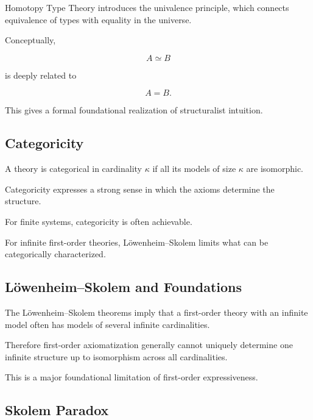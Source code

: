 Homotopy Type Theory introduces the univalence principle, which connects
equivalence of types with equality in the universe.

Conceptually,

\[
\boxed{
A\simeq B
}
\]

is deeply related to

\[
\boxed{
A=B.
}
\]

This gives a formal foundational realization of structuralist intuition.

\subsection{Categoricity}
\label{subsec:categoricity-foundations}

A theory is categorical in cardinality \(\kappa\) if all its models of size
\(\kappa\) are isomorphic.

Categoricity expresses a strong sense in which the axioms determine the
structure.

For finite systems, categoricity is often achievable.

For infinite first-order theories, Löwenheim--Skolem limits what can be
categorically characterized.

\subsection{Löwenheim--Skolem and Foundations}
\label{subsec:lowenheim-skolem-foundations}

The Löwenheim--Skolem theorems imply that a first-order theory with an
infinite model often has models of several infinite cardinalities.

Therefore first-order axiomatization generally cannot uniquely determine one
infinite structure up to isomorphism across all cardinalities.

This is a major foundational limitation of first-order expressiveness.

\subsection{Skolem Paradox}
\label{subsec:skolem-paradox-philosophy}

